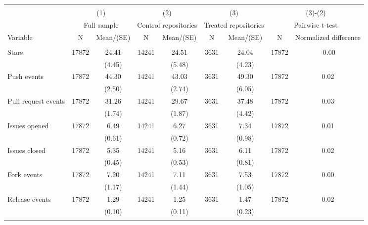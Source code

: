 \begin{tabular}{@{\extracolsep{5pt}}lcccccccc}
\\[-1.8ex]\hline \hline \\[-1.8ex]
 & \multicolumn{2}{c}{(1)}  & \multicolumn{2}{c}{(2)}  & \multicolumn{2}{c}{(3)}  & \multicolumn{2}{c}{(3)-(2)} \\
 & \multicolumn{2}{c}{Full sample}  & \multicolumn{2}{c}{Control repositories}  & \multicolumn{2}{c}{Treated repositories}  & \multicolumn{2}{c}{Pairwise t-test}  \\
Variable & N & Mean/(SE) & N & Mean/(SE) & N & Mean/(SE) & N & Normalized difference \\ \hline \\[-1.8ex] 
Stars   & 17872    & 24.41    & 14241    & 24.51    & 3631    & 24.04    & 17872    & -0.00   \\
 &   & (4.45)  &   & (5.48)  &   & (4.23)  &   &  \\ [1ex]
Push events   & 17872    & 44.30    & 14241    & 43.03    & 3631    & 49.30    & 17872    & 0.02   \\
 &   & (2.50)  &   & (2.74)  &   & (6.05)  &   &  \\ [1ex]
Pull request events   & 17872    & 31.26    & 14241    & 29.67    & 3631    & 37.48    & 17872    & 0.03   \\
 &   & (1.74)  &   & (1.87)  &   & (4.42)  &   &  \\ [1ex]
Issues opened   & 17872    & 6.49    & 14241    & 6.27    & 3631    & 7.34    & 17872    & 0.01   \\
 &   & (0.61)  &   & (0.72)  &   & (0.98)  &   &  \\ [1ex]
Issues closed   & 17872    & 5.35    & 14241    & 5.16    & 3631    & 6.11    & 17872    & 0.02   \\
 &   & (0.45)  &   & (0.53)  &   & (0.81)  &   &  \\ [1ex]
Fork events   & 17872    & 7.20    & 14241    & 7.11    & 3631    & 7.53    & 17872    & 0.00   \\
 &   & (1.17)  &   & (1.44)  &   & (1.05)  &   &  \\ [1ex]
Release events   & 17872    & 1.29    & 14241    & 1.25    & 3631    & 1.47    & 17872    & 0.02   \\
 &   & (0.10)  &   & (0.11)  &   & (0.23)  &   &  \\ [1ex]
\hline \hline \\[-1.8ex]

\end{tabular}

